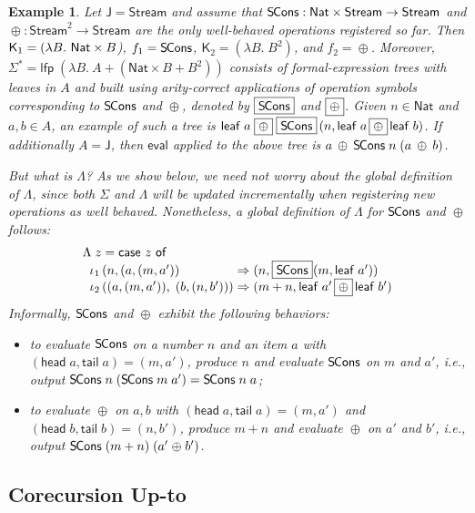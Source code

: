 \documentclass[preprint,draft]
{sigplanconf}
\newcommand\vthinspace{\kern.08333ex}
\newcommand\TC{\mathsf}
\newtheorem{eexample}[theorem]{Example}
\newcommand{\ra}{\rightarrow}
\newcommand{\<}{\langle}
\renewcommand{\>}{\rangle}
\renewcommand{\l}{\Lambda}
\renewcommand{\eta}{{{\mathsf{leaf}}}}
\newcommand{\lfp}{{{\mathsf{lfp}}}}
\newcommand{\eval}{{{\mathsf{eval}}}}
\newcommand{\hd}{{{\mathsf{head}}}}
\newcommand{\tl}{{{\mathsf{tail}}}}
\newcommand{\SCons}{{{\mathsf{S\hspace*{-0.2ex}Cons}}}}
\newcommand{\opls}{\mathrel\oplus}
\newcommand{\J}{{\TC{J}}}
\renewcommand{\SS}{{\TC{\Sigma}}}
\newcommand{\K}{{\TC{K}}}
\newcommand\Stream{\TC{Stream}}
\newcommand\Nat{{\TC{Nat}}}
\newcommand\bb[1]{\fbox{$#1$}}
\begin{document}
\begin{eexample}\rm \label{exa-state}
Let $\J = \Stream$ and assume that $\SCons : \Nat \times \Stream \ra \Stream$ and
$\opls : \Stream^2 \ra \Stream$ are the only well-behaved operations registered so far.
Then $\K_1 = (\lambda B.~\Nat \times\nobreak B$), $f_1 = \SCons$,
$\K_2 = (\lambda B.\;B^2)$, and $f_2 = {\opls}$.
Moreover, $\SS^* = \lfp\;(\lambda B.\allowbreak~A \allowbreak + (\Nat \times B + B^2))$
consists of formal-expression trees with leaves in $A$ and built using
arity-correct applications of operation symbols corresponding to
$\SCons$ and $\opls$, denoted by $\bb{\SCons}$ and $\bb{\opls}$.  Given $n \in \Nat$ and $a,b \in A$,
an example of such a tree is $\eta\;a \;\bb{\opls}\; \bb{\SCons}\,(n,\eta\;a \,\bb{\opls}\, \eta\;b)$.
If additionally $A = \J$, then $\eval$ applied to the above tree is $a \,\opls\, \SCons\;n\;(a \,\opls\, b)$.

But what is $\l$? As we show below, we need not worry about the global definition of $\l$, since both $\SS$ and $\l$ will be updated
{incrementally} when registering new operations as well behaved.
Nonetheless, a global definition of $\l$ for $\SCons$ and $\opls$ follows:
$$
\begin{array}{@{}l@{}}
\l\;z = \textsf{case $z$ of} \\
\hspace*{1.3ex}
 \begin{array}{@{}l@{\;}l@{\;}l@{}}
  \iota_1\,(n,(a,(m,a')) & \Ra & (n,\vthinspace \bb{\SCons}\vthinspace(m,\eta\;a')) \\
  \iota_2\,((a,(m,a')),\;(b,(n,b'))) & \Ra & (m + n,\vthinspace \eta\;a' \,\bb{\opls}\, \eta\;b')
  \end{array}
\end{array}
$$
Informally, $\SCons$ and $\opls$ exhibit the following behaviors:
\begin{itemize}
\item to evaluate $\SCons$ on a number $n$ and an item $a$ with $(\hd\;a,\allowbreak \tl\;a) = (m,a')$,
produce $n$ and evaluate $\SCons$ on $m$ and $a'$, i.e.,
output $\SCons\;n\;(\SCons\;m\;a') = \SCons\;n\;a$;
\item to evaluate $\opls$ on $a, b$ with $(\hd\;a, \tl\;a) = (m,a')$ and $(\hd\;b,\tl\;b) = (n,b')$,
produce $m+n$ and evaluate $\opls$ on $a'$ and $b'$, i.e., output
$\SCons\;(m+n)\;(a' \opls b')$.
\end{itemize}
\end{eexample}

\subsection{Corecursion Up-to}
\label{sec-corec-princ}
\end{document}
